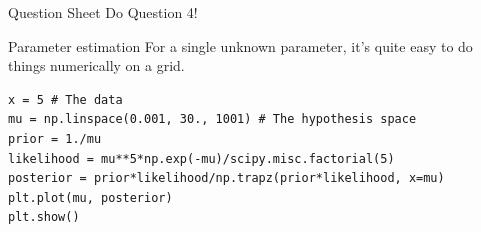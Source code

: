 \documentclass{beamer}
\begin{document}
\begin{frame}[t]{Question Sheet}
Do Question 4!
\end{frame}


\begin{frame}[fragile, t]{Parameter estimation}
For a single unknown parameter, it's quite easy to do things numerically
on a grid.

\begin{verbatim}
x = 5 # The data
mu = np.linspace(0.001, 30., 1001) # The hypothesis space
prior = 1./mu
likelihood = mu**5*np.exp(-mu)/scipy.misc.factorial(5)
posterior = prior*likelihood/np.trapz(prior*likelihood, x=mu)
plt.plot(mu, posterior)
plt.show()
\end{verbatim}


\end{frame}
\end{document}
